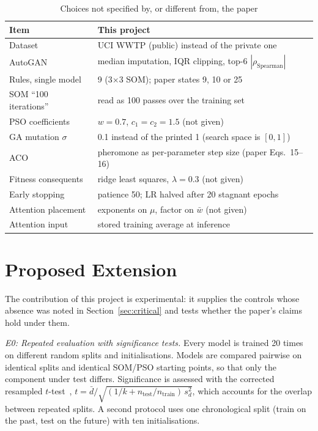 \documentclass[conference]{IEEEtran}
\begin{document}
\begin{table}[t]
\caption{Choices not specified by, or different from, the paper}
\label{tab:dev}
\centering
\footnotesize
\begin{tabular}{p{2.6cm}p{5.2cm}}
\toprule
Item & This project \\
\midrule
Dataset & UCI WWTP (public) instead of the private one \\
AutoGAN & median imputation, IQR clipping, top-6 $|\rho_\text{Spearman}|$ \\
Rules, single model & 9 (3$\times$3 SOM); paper states 9, 10 or 25 \\
SOM ``100 iterations'' & read as 100 passes over the training set \\
PSO coefficients & $w=0.7$, $c_1=c_2=1.5$ (not given) \\
GA mutation $\sigma$ & 0.1 instead of the printed 1 (search space is $[0,1]$) \\
ACO & pheromone as per-parameter step size (paper Eqs.~15--16) \\
Fitness consequents & ridge least squares, $\lambda=0.3$ (not given) \\
Early stopping & patience 50; LR halved after 20 stagnant epochs \\
Attention placement & exponents on $\mu$, factor on $\bar w$ (not given) \\
Attention input & stored training average at inference \\
\bottomrule
\end{tabular}
\end{table}

\section{Proposed Extension}
The contribution of this project is experimental: it supplies the controls whose absence was noted in Section~\ref{sec:critical} and tests whether the paper's claims hold under them.

\emph{E0: Repeated evaluation with significance tests.} Every model is trained 20 times on different random splits and initialisations. Models are compared pairwise on identical splits and identical SOM/PSO starting points, so that only the component under test differs. Significance is assessed with the corrected resampled $t$-test~\cite{nadeau2003}, $t = \bar d / \sqrt{(1/k + n_\text{test}/n_\text{train})\,s_d^2}$, which accounts for the overlap between repeated splits. A second protocol uses one chronological split (train on the past, test on the future) with ten initialisations.
\end{document}
